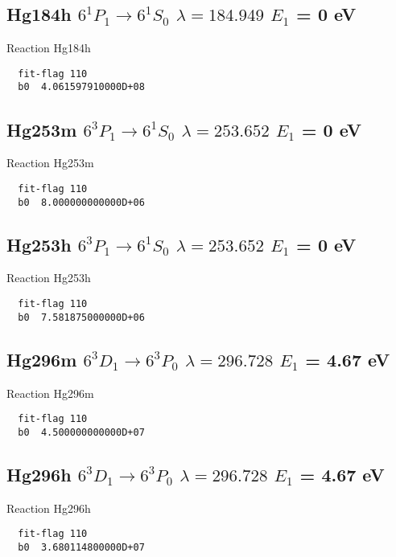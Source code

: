 \documentclass[12pt]{article}
\begin{document}
\subsection{
Hg184h   $6^1P_1 \rightarrow 6^1S_0 $ $\lambda= 184.949$ $E_1$ = 0 eV
}
Reaction Hg184h
\begin{small}\begin{verbatim}
  fit-flag 110
  b0  4.061597910000D+08
\end{verbatim}\end{small}

\subsection{
Hg253m   $6^3P_1 \rightarrow 6^1S_0 $ $\lambda= 253.652$ $E_1$ = 0 eV
}
Reaction Hg253m
\begin{small}\begin{verbatim}
  fit-flag 110
  b0  8.000000000000D+06
\end{verbatim}\end{small}

\subsection{
Hg253h   $6^3P_1 \rightarrow 6^1S_0 $ $\lambda= 253.652$ $E_1$ = 0 eV
}
Reaction Hg253h
\begin{small}\begin{verbatim}
  fit-flag 110
  b0  7.581875000000D+06
\end{verbatim}\end{small}

\subsection{
Hg296m   $6^3D_1 \rightarrow 6^3P_0 $ $\lambda= 296.728$ $E_1$ = 4.67 eV
}
Reaction Hg296m
\begin{small}\begin{verbatim}
  fit-flag 110
  b0  4.500000000000D+07
\end{verbatim}\end{small}

\subsection{
Hg296h   $6^3D_1 \rightarrow 6^3P_0 $ $\lambda= 296.728$ $E_1$ = 4.67 eV
}
Reaction Hg296h
\begin{small}\begin{verbatim}
  fit-flag 110
  b0  3.680114800000D+07
\end{verbatim}\end{small}
\end{document}
